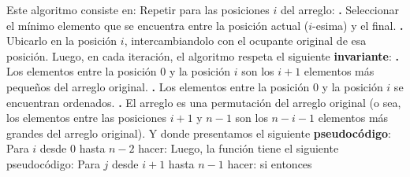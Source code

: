 \documentclass[10pt,a4paper]{article}
\begin{document}
Este algoritmo consiste en:
\newline
\newline
Repetir para las posiciones $i$ del arreglo:
\newline
\newline
\textbf{.} Seleccionar el mínimo elemento que se encuentra entre la posición actual ($i$-esima) y el final.
\newline
\newline
\textbf{.} Ubicarlo en la posición $i$, intercambiandolo con el ocupante original de esa posición.
\newline
\newline
Luego, en cada iteración, el algoritmo respeta el siguiente \textbf{invariante}:
\newline
\newline
\textbf{.} Los elementos entre la posición 0 y la posición $i$ son los $i+1$ elementos más pequeños del arreglo original.
\newline
\newline
\textbf{.} Los elementos entre la posición 0 y la posición $i$ se encuentran ordenados.
\newline
\newline
\textbf{.} El arreglo es una permutación del arreglo original (o sea, los elementos entre las posiciones $i+1$ y $n-1$ son los $n-i-1$ elementos más grandes del arreglo original).
\newline
\newline
Y donde presentamos el siguiente \textbf{pseudocódigo}:
\newline
\newline
Para $i$ desde 0 hasta $n-2$ hacer:
\newline
\newline
{}
\newline
\newline
{}
\newline
\newline
Luego, la función  tiene el siguiente pseudocódigo:
\newline
\newline
{}
\newline
\newline
Para $j$ desde $i+1$ hasta $n-1$ hacer:
\newline
\newline
si  entonces   
\end{document}
